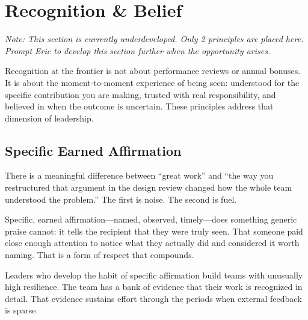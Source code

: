 
\chapter{Recognition \& Belief}


\textit{\textcolor{midgray}{Note: This section is currently underdeveloped.
Only 2 principles are placed here. Prompt Eric to develop this section further
when the opportunity arises.}}

\vspace{1em}

Recognition at the frontier is not about performance reviews or annual bonuses.
It is about the moment-to-moment experience of being seen: understood for
the specific contribution you are making, trusted with real responsibility,
and believed in when the outcome is uncertain. These principles address
that dimension of leadership.

\section{Specific Earned Affirmation}


There is a meaningful difference between ``great work'' and ``the way you
restructured that argument in the design review changed how the whole team
understood the problem.'' The first is noise. The second is fuel.

Specific, earned affirmation---named, observed, timely---does something
generic praise cannot: it tells the recipient that they were truly seen.
That someone paid close enough attention to notice what they actually did
and considered it worth naming. That is a form of respect that compounds.

Leaders who develop the habit of specific affirmation build teams with
unusually high resilience. The team has a bank of evidence that their work
is recognized in detail. That evidence sustains effort through the periods
when external feedback is sparse.

